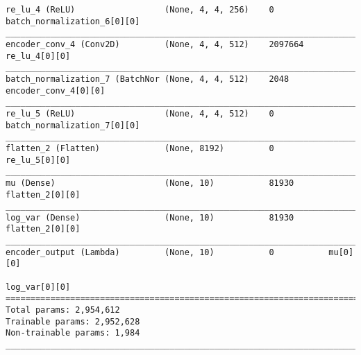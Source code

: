 \begin{lstlisting}[caption={\textsc{Mnist}-\ac{VAE}-\ac{GAN} Encoder},captionpos=b,basicstyle=\tiny, label={lst:mnist-vae-encoder}]
re_lu_4 (ReLU)                  (None, 4, 4, 256)    0           batch_normalization_6[0][0]
__________________________________________________________________________________________________
encoder_conv_4 (Conv2D)         (None, 4, 4, 512)    2097664     re_lu_4[0][0]
__________________________________________________________________________________________________
batch_normalization_7 (BatchNor (None, 4, 4, 512)    2048        encoder_conv_4[0][0]
__________________________________________________________________________________________________
re_lu_5 (ReLU)                  (None, 4, 4, 512)    0           batch_normalization_7[0][0]
__________________________________________________________________________________________________
flatten_2 (Flatten)             (None, 8192)         0           re_lu_5[0][0]
__________________________________________________________________________________________________
mu (Dense)                      (None, 10)           81930       flatten_2[0][0]
__________________________________________________________________________________________________
log_var (Dense)                 (None, 10)           81930       flatten_2[0][0]
__________________________________________________________________________________________________
encoder_output (Lambda)         (None, 10)           0           mu[0][0]
                                                                 log_var[0][0]
==================================================================================================
Total params: 2,954,612
Trainable params: 2,952,628
Non-trainable params: 1,984
__________________________________________________________________________________________________
\end{lstlisting}